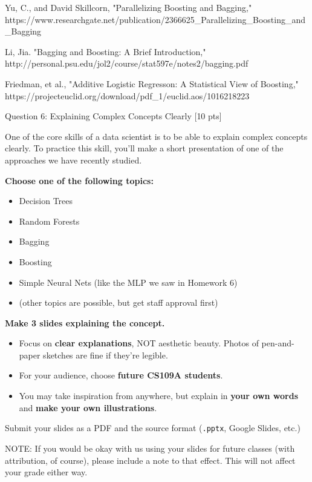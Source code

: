 \documentclass[11pt]{article}
\providecommand{\tightlist}{%
      \setlength{\itemsep}{0pt}\setlength{\parskip}{0pt}}
\begin{document}
Yu, C., and David Skillcorn, "Parallelizing Boosting and Bagging,"
https://www.researchgate.net/publication/2366625\_Parallelizing\_Boosting\_and\_Bagging

Li, Jia. "Bagging and Boosting: A Brief Introduction,"
http://personal.psu.edu/jol2/course/stat597e/notes2/bagging.pdf

Friedman, et al., "Additive Logistic Regresson: A Statistical View of
Boosting,"
https://projecteuclid.org/download/pdf\_1/euclid.aos/1016218223

     Question 6: Explaining Complex Concepts Clearly {[}10 pts{]}

    One of the core skills of a data scientist is to be able to explain
complex concepts clearly. To practice this skill, you'll make a short
presentation of one of the approaches we have recently studied.

\textbf{Choose one of the following topics:}

\begin{itemize}
\tightlist
\item
  Decision Trees
\item
  Random Forests
\item
  Bagging
\item
  Boosting
\item
  Simple Neural Nets (like the MLP we saw in Homework 6)
\item
  (other topics are possible, but get staff approval first)
\end{itemize}

\textbf{Make 3 slides explaining the concept.}

\begin{itemize}
\tightlist
\item
  Focus on \textbf{clear explanations}, NOT aesthetic beauty. Photos of
  pen-and-paper sketches are fine if they're legible.
\item
  For your audience, choose \textbf{future CS109A students}.
\item
  You may take inspiration from anywhere, but explain in \textbf{your
  own words} and \textbf{make your own illustrations}.
\end{itemize}

Submit your slides as a PDF and the source format (\texttt{.pptx},
Google Slides, etc.)

NOTE: If you would be okay with us using your slides for future classes
(with attribution, of course), please include a note to that effect.
This will not affect your grade either way.


    
    
    
    
\end{document}
